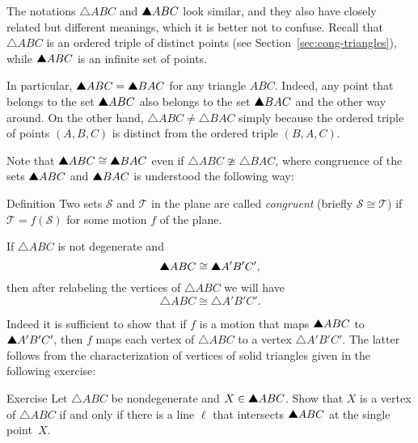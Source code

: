 

The notations $\triangle ABC$ and $\solidtriangle ABC$ look similar, 
and they also have closely related but different meanings, which it is better not to confuse.
Recall that $\triangle ABC$ is an ordered triple of distinct points
(see Section~\ref{sec:cong-triangles}),
while $\solidtriangle ABC$ is an infinite set of points.

In particular, $\solidtriangle ABC=\solidtriangle BAC$ for any triangle $ABC$.
Indeed, any point that belongs to the set $\solidtriangle ABC$ 
also belongs to the set $\solidtriangle BAC$
and the other way around.
On the other hand,
$\triangle ABC\ne\triangle BAC$ simply because the ordered triple of points $(A,B,C)$ is distinct from the ordered triple $(B,A,C)$.

Note that $\solidtriangle ABC\cong\solidtriangle BAC$ even if $\triangle ABC\ncong\triangle BAC$, where congruence of the sets $\solidtriangle ABC$ and $\solidtriangle BAC$ 
is understood the following way:

\begin{thm}{Definition}\label{def:cong-sets}
Two sets $\mathcal{S}$ and $\mathcal{T}$ in the plane  
are called \emph{congruent} 
(briefly $\mathcal{S}\cong \mathcal{T}$)
if 
$\mathcal{T}=f(\mathcal{S})$ for some motion $f$ of the plane.
\end{thm}

If $\triangle ABC$ is not degenerate
and \[\solidtriangle ABC\cong \solidtriangle A'B'C',\]
then after relabeling the vertices of $\triangle ABC$ 
we will have 
\[\triangle ABC\cong \triangle A'B'C'.\]

Indeed it is sufficient to show that 
if $f$ is a motion that maps $\solidtriangle ABC$ to $\solidtriangle A'B'C'$,
then $f$ maps each vertex of $\triangle ABC$ to a vertex $\triangle A'B'C'$.
The latter follows from the characterization of vertices of solid triangles given in the following exercise:

\begin{thm}{Exercise}\label{ex:vertex}
Let $\triangle ABC$ be nondegenerate and $X\z\in \solidtriangle ABC$.
Show that $X$ is a vertex of $\triangle ABC$
if and only if there is a line $\ell$ that intersects $\solidtriangle ABC$
at the single point~$X$.
\end{thm}

